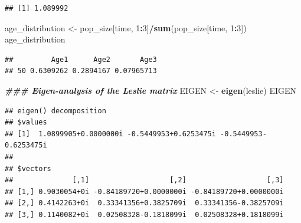 \documentclass[
]{book}
\newenvironment{Shaded}{\begin{snugshade}}{\end{snugshade}}
\newcommand{\CommentTok}[1]{\textcolor[rgb]{0.56,0.35,0.01}{\textit{#1}}}
\newcommand{\DecValTok}[1]{\textcolor[rgb]{0.00,0.00,0.81}{#1}}
\newcommand{\DocumentationTok}[1]{\textcolor[rgb]{0.56,0.35,0.01}{\textbf{\textit{#1}}}}
\newcommand{\FunctionTok}[1]{\textcolor[rgb]{0.13,0.29,0.53}{\textbf{#1}}}
\newcommand{\NormalTok}[1]{#1}
\newcommand{\OtherTok}[1]{\textcolor[rgb]{0.56,0.35,0.01}{#1}}
\newcommand{\SpecialCharTok}[1]{\textcolor[rgb]{0.81,0.36,0.00}{\textbf{#1}}}
\begin{document}
\begin{Shaded}
\end{Shaded}

\begin{verbatim}
## [1] 1.089992
\end{verbatim}

\begin{Shaded}
\begin{Highlighting}[]
\NormalTok{age\_distribution }\OtherTok{\textless{}{-}}\NormalTok{ pop\_size[time, }\DecValTok{1}\SpecialCharTok{:}\DecValTok{3}\NormalTok{]}\SpecialCharTok{/}\FunctionTok{sum}\NormalTok{(pop\_size[time, }\DecValTok{1}\SpecialCharTok{:}\DecValTok{3}\NormalTok{])}
\NormalTok{age\_distribution}
\end{Highlighting}
\end{Shaded}

\begin{verbatim}
##         Age1      Age2       Age3
## 50 0.6309262 0.2894167 0.07965713
\end{verbatim}

\begin{Shaded}
\begin{Highlighting}[]
\DocumentationTok{\#\#\# Eigen{-}analysis of the Leslie matrix}
\NormalTok{EIGEN }\OtherTok{\textless{}{-}} \FunctionTok{eigen}\NormalTok{(leslie)}
\NormalTok{EIGEN}
\end{Highlighting}
\end{Shaded}

\begin{verbatim}
## eigen() decomposition
## $values
## [1]  1.0899905+0.0000000i -0.5449953+0.6253475i -0.5449953-0.6253475i
## 
## $vectors
##              [,1]                   [,2]                   [,3]
## [1,] 0.9030054+0i -0.84189720+0.0000000i -0.84189720+0.0000000i
## [2,] 0.4142263+0i  0.33341356+0.3825709i  0.33341356-0.3825709i
## [3,] 0.1140082+0i  0.02508328-0.1818099i  0.02508328+0.1818099i
\end{verbatim}

\begin{Shaded}
\end{Shaded}
\end{document}
